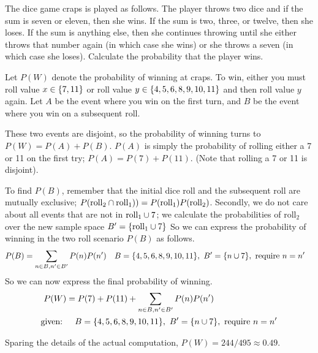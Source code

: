 \documentclass{article}
\begin{document}
    \newpage

    \begin{problem}
        The dice game craps is played as follows. The player throws two dice and if the sum is seven or eleven, then she wins. If the sum is two, three, or twelve, then she loses. If the sum is anything else, then she continues throwing until she either throws that number again (in which case she wins) or she throws a seven (in which case she loses). Calculate the probability that the player wins.
    \end{problem}

    \begin{solution}
        Let $P(W)$ denote the probability of winning at craps. To win, either you must roll value $x \in \{7, 11\}$ or roll value $y \in \{4, 5, 6, 8, 9, 10, 11\}$ and then roll value $y$ again. Let $A$ be the event where you win on the first turn, and $B$ be the event where you win on a subsequent roll. 

        These two events are disjoint, so the probability of winning turns to $P(W) = P(A) + P(B)$. $P(A)$ is simply the probability of rolling either a 7 or 11 on the first try; $P(A) = P(7) + P(11)$. (Note that rolling a 7 or 11 is disjoint).

        To find $P(B)$, remember that the initial dice roll and the subsequent roll are mutually exclusive; $P(\text{roll}_2 \cap \text{roll}_1)) = P(\text{roll}_1)P(\text{roll}_2)$. Secondly, we do not care about all events that are not in $\text{roll}_1 \cup 7$; we calculate the probabilities of $\text{roll}_2$ over the new sample space $B' = \{\text{roll}_1 \cup 7\}$ So we can express the probability of winning in the two roll scenario $P(B)$ as follows.
        \begin{align*}
            P(B) &= \sum_{n \in B, n' \in B'} P(n)P(n')  && B = \{4, 5, 6, 8, 9, 10, 11\}, \ B' = \{n \cup 7\}, 
            \ \text{require } n = n'
        \end{align*}
        So we can now express the final probability of winning.
        \begin{equation}
            \begin{aligned}
                P(W) &= P(7) + P(11) +  \sum_{n \in B, n' \in B'} P(n)P(n')  \\ 
                \text{given: } & \quad B = \{4, 5, 6, 8, 9, 10, 11\}, \ B' = \{n \cup 7\}, \ \text{require } n = n'
            \end{aligned}
        \end{equation}
        
        Sparing the details of the actual computation, $P(W) = 244/495 \approx 0.49$.
    \end{solution}
\end{document}
